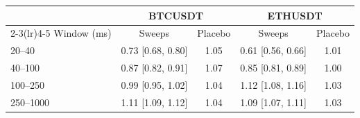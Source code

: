 \begin{tabular}{lcccc}
\toprule
 & \multicolumn{2}{c}{BTCUSDT} & \multicolumn{2}{c}{ETHUSDT} \\
\cmidrule(lr){2-3}\cmidrule(lr){4-5}
Window (ms) & Sweeps & Placebo & Sweeps & Placebo \\
\midrule
20--40 & 0.73 [0.68, 0.80] & 1.05 & 0.61 [0.56, 0.66] & 1.01 \\
40--100 & 0.87 [0.82, 0.91] & 1.07 & 0.85 [0.81, 0.89] & 1.00 \\
100--250 & 0.99 [0.95, 1.02] & 1.04 & 1.12 [1.08, 1.16] & 1.03 \\
250--1000 & 1.11 [1.09, 1.12] & 1.04 & 1.09 [1.07, 1.11] & 1.03 \\
\bottomrule
\end{tabular}
